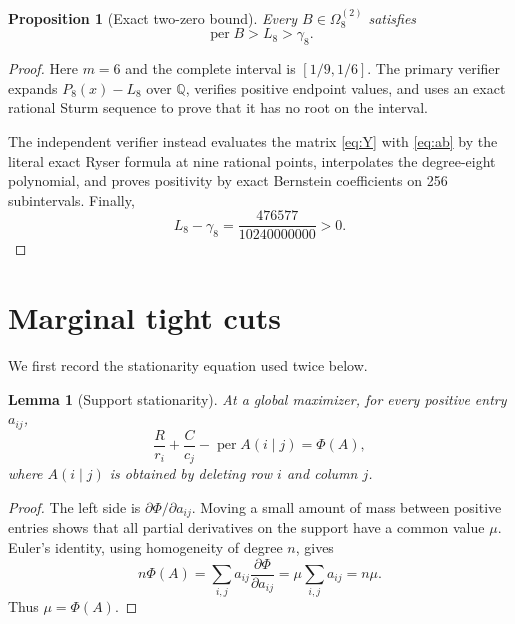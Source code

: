 \documentclass[11pt]{article}
\newtheorem{lemma}[theorem]{Lemma}
\newtheorem{proposition}[theorem]{Proposition}
\theoremstyle{remark}
\newcommand{\per}{\operatorname{per}}
\newcommand{\QQ}{\mathbb Q}
\begin{document}
\begin{proposition}[Exact two-zero bound]\label{prop:two-zero-bound}
Every $B\in\Omega_8^{(2)}$ satisfies
\[
 \per B>L_8>\gamma_8.
\]
\end{proposition}
\begin{proof}
Here $m=6$ and the complete interval is $[1/9,1/6]$.  The primary verifier
expands $P_8(x)-L_8$ over $\QQ$, verifies positive endpoint values, and uses
an exact rational Sturm sequence to prove that it has no root on the interval.

The independent verifier instead evaluates the matrix \eqref{eq:Y} with
\eqref{eq:ab} by the literal exact Ryser formula at nine rational points,
interpolates the degree-eight polynomial, and proves positivity by exact
Bernstein coefficients on 256 subintervals.  Finally,
\begin{equation}\label{eq:L-gap}
 L_8-\gamma_8=
 \frac{476577}{10240000000}>0.
\end{equation}
\end{proof}

\section{Marginal tight cuts}\label{sec:marginal}

We first record the stationarity equation used twice below.

\begin{lemma}[Support stationarity]\label{lem:stationarity}
At a global maximizer, for every positive entry $a_{ij}$,
\begin{equation}\label{eq:stationarity}
 \frac{R}{r_i}+\frac{C}{c_j}-\per A(i\mid j)=\Phi(A),
\end{equation}
where $A(i\mid j)$ is obtained by deleting row $i$ and column $j$.
\end{lemma}
\begin{proof}
The left side is $\partial\Phi/\partial a_{ij}$.  Moving a small amount of
mass between positive entries shows that all partial derivatives on the
support have a common value $\mu$.  Euler's identity, using homogeneity of
degree $n$, gives
\[
 n\Phi(A)=\sum_{i,j}a_{ij}\frac{\partial\Phi}{\partial a_{ij}}
 =\mu\sum_{i,j}a_{ij}=n\mu.
\]
Thus $\mu=\Phi(A)$.
\end{proof}
\end{document}
